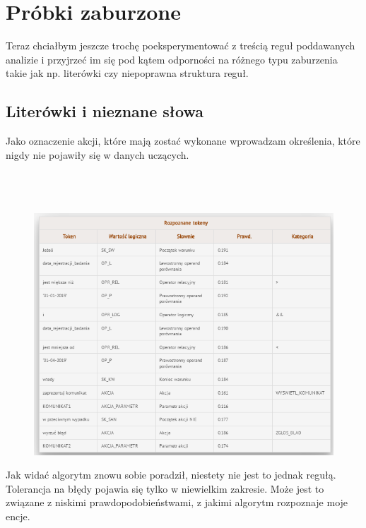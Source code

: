\section{Próbki zaburzone}
Teraz chciałbym jeszcze trochę poeksperymentować z treścią reguł poddawanych analizie i przyjrzeć im się pod kątem odporności na różnego typu zaburzenia takie jak np. literówki czy niepoprawna struktura reguł. 
\subsection{Literówki i nieznane słowa}
Jako oznaczenie akcji, które mają zostać wykonane wprowadzam określenia, które nigdy nie pojawiły się w danych uczących. 
\\ \\
\\ \\

\begin{figure}[H]
	\centering
	\includegraphics[scale=0.8]{img/app-eksperymenty/p5-1.png}
\end{figure}

Jak widać algorytm znowu sobie poradził,  niestety nie jest to jednak regułą. Tolerancja na błędy pojawia się tylko w niewielkim zakresie. Może jest to związane z niskimi prawdopodobieństwami, z jakimi algorytm rozpoznaje moje encje. 


